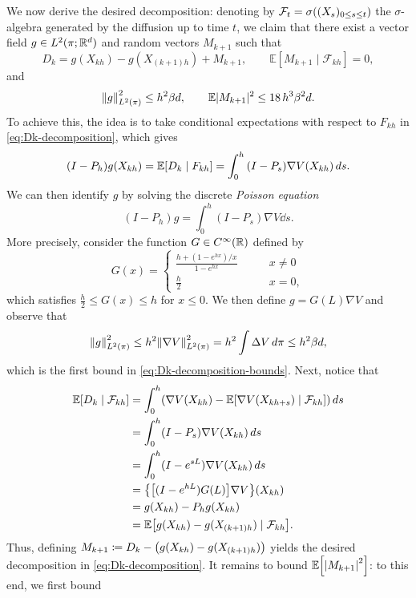 \documentclass[11pt,a4paper]{article}
\begin{document}
    We now derive the desired decomposition: denoting by $\mathcal{F}_t = \sigma\tond*{(X_s)_{0\le s \le t}}$ the $\sigma$-algebra generated by the diffusion up to time $t$, we claim that 
    there exist a vector field $g\in L^2(\pi;\R^d)$ and random vectors
    $M_{k+1}$ such that
    \begin{equation}
        D_k=g(X_{kh})-g(X_{(k+1)h})+M_{k+1},
        \qquad
        \mathbb{E}[M_{k+1}\mid\mathcal{F}_{kh}]=0,
        \label{eq:Dk-decomposition}
    \end{equation}
    and
    \begin{equation}
        \norm*{g}^2_{L^2(\pi)}\leq h^{2}\beta d,
        \qquad
        \mathbb{E}\abs{M_{k+1}}^2\leq 18\, h^3\beta^{2}d.
        \label{eq:Dk-decomposition-bounds}
    \end{equation}
    To achieve this, the idea is to take conditional expectations with respect to $F_{kh}$ in \eqref{eq:Dk-decomposition}, which gives
    \[
        (I-P_h)g(X_{kh}) = \expe{D_k\mid F_{kh}} = \int_0^h {(I-P_s) \nabla V (X_{kh})} \dd s.
    \]
    We can then identify $g$ by solving the discrete \emph{Poisson equation} \cite{meyn2012markov}
    \[
        (I-P_h) g = \int_0^h (I-P_s) \nabla V \dd s.
    \]
    More precisely, consider the function $G\in C^\infty(\R)$ defined by 
    \[
            G(x) = \begin{cases}
                \frac{h + (1-e^{hx})/x}{1-e^{hx}}\qquad &x \neq 0\\
                \frac{h}{2} \qquad &x = 0,
            \end{cases}
    \]
    which satisfies $\frac{h}{2}\le G(x) \le h$ for $x\le 0$.  
    We then define $g = G(L) \nabla V$ and observe that
    \begin{equation}\label{eq:L2-vector-field}
        \norm*{g}^2_{L^2(\pi)} \leq h^2\norm*{\nabla V}^2_{L^2(\pi)} = h^2\int \Delta V \dd\pi \leq h^{2}\beta d,
    \end{equation}
    which is the first bound in \eqref{eq:Dk-decomposition-bounds}. 
    Next, notice that 
    \[
    \begin{split}
        \expe{D_k \mid \mathcal{F}_{kh}} & = \int_0^h \tond*{\nabla V(X_{kh}) - \expe{\nabla V(X_{kh+s}) \mid \ff_{kh}} } \dd s  
        \\
        & = \int_0^h (I- P_s) \nabla V(X_{kh}) \dd s
        \\
        & = \int_0^h (I- e^{sL}) \nabla V(X_{kh}) \dd s
        \\
        & = \graf*{\quadr*{(I-e^{hL})G(L)}\nabla V}(X_{kh})
        \\
        & = g(X_{kh}) - P_h g(X_{kh})
        \\
        & = \expe{g(X_{kh}) - g(X_{(k+1)h})\mid \ff_{kh}}.
    \end{split}      
    \]
    Thus, defining $M_{k+1} \coloneq D_k - \tond*{g(X_{kh}) - g(X_{(k+1)h})}$ yields the desired decomposition in \eqref{eq:Dk-decomposition}.
    It remains to bound $\expe{\abs*{M_{k+1}}^2}$: to this end, we first bound
    
\end{document}
